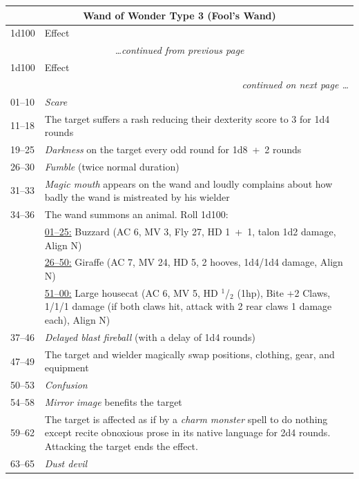 \noindent \begin{longtable}{|p{}|p{}|}
\multicolumn{2}{c}{Wand of Wonder Type 3 (Fool's Wand)} \\
\hline
1d100	& Effect \\
\hline\hline
\endfirsthead
\multicolumn{2}{c}{\textit{\ldots continued from previous page}} \\
\hline
1d100	& Effect \\
\hline\hline
\endhead
\hline
\multicolumn{2}{r}{\textit{continued on next page \ldots}}\\
\endfoot
\hline
\endlastfoot
\rowcolor[gray]{.9}01--10	& \textit{Scare} \\
11--18	& The target suffers a rash reducing their dexterity score to 3 for 1d4 rounds \\
\rowcolor[gray]{.9}19--25	& \textit{Darkness} on the target every odd round for 1d8~+~2 rounds \\
26--30	& \textit{Fumble} (twice normal duration) \\
\rowcolor[gray]{.9}31--33	& \textit{Magic mouth} appears on the wand and loudly complains about how badly the wand is mistreated by his wielder \\
34--36	& The wand summons an animal.  Roll 1d100: \\
		& \underline{01--25:} Buzzard (AC 6, MV 3, Fly 27, HD 1~+~1, talon 1d2 damage, Align N) \\
		& \underline{26--50:} Giraffe (AC 7, MV 24, HD 5, 2 hooves, 1d4/1d4 damage, Align N) \\
		& \underline{51--00:} Large housecat (AC 6, MV 5, HD $^1$/$_2$ (1hp), Bite +2 Claws, 1/1/1 damage (if both claws hit, attack with 2 rear claws 1 damage each), Align N) \\
\rowcolor[gray]{.9}37--46	& \textit{Delayed blast fireball} (with a delay of 1d4 rounds) \\
47--49	& The target and wielder magically swap positions, clothing, gear, and equipment \\ 
\rowcolor[gray]{.9}50--53	& \textit{Confusion} \\
54--58	& \textit{Mirror image} benefits the target \\
\rowcolor[gray]{.9}59--62	& The target is affected as if by a \textit{charm monster} spell to do nothing except recite obnoxious prose in its native language for 2d4 rounds.  Attacking the target ends the effect. \\
63--65	& \textit{Dust devil} \\

\end{longtable}
